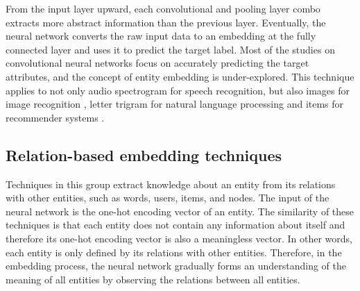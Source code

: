 \documentclass[12pt]{WSUThesis}
\theoremstyle{definition}
\begin{document}
From the input layer upward,
each convolutional and pooling layer combo extracts more abstract information
than the previous layer.
Eventually, the neural network converts the raw input data to an embedding
at the fully connected layer and uses it to predict the target label.
Most of the studies on convolutional neural networks focus on accurately
predicting the target attributes,
and the concept of entity embedding is under-explored.
This technique applies to not only audio spectrogram for speech recognition, but also images for image recognition \cite{krizhevsky2012imagenet},
letter trigram for natural language processing \cite{collobert2008unified}
and items for recommender systems \cite{elkahky2015multi}.

\subsection{Relation-based embedding techniques}
Techniques in this group extract knowledge about an entity from its relations 
with other entities, such as words, users, items, and nodes.
The input of the neural network is the one-hot encoding vector of an entity.
The similarity of these techniques is that each entity does not contain any
information about itself and therefore its one-hot encoding vector is also
a meaningless vector.
In other words, each entity is only defined by its relations with other entities.
Therefore, in the embedding process, the neural network gradually
forms an understanding of the meaning of all entities by observing the relations
between all entities.
\end{document}
